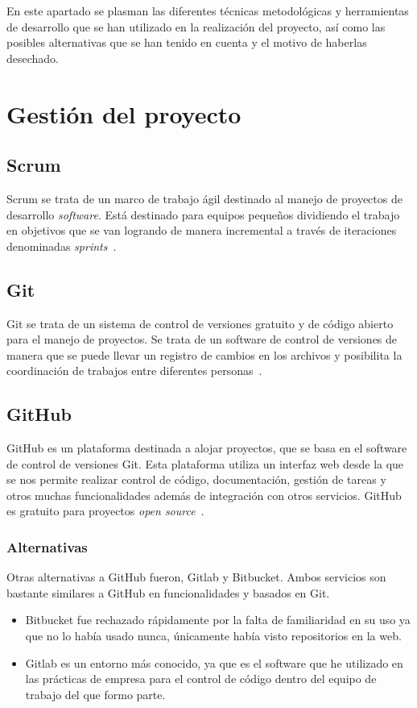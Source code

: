 
En este apartado se plasman las diferentes técnicas metodológicas y herramientas de desarrollo que se han utilizado en la realización del proyecto, así como las posibles alternativas que se han tenido en cuenta y el motivo de haberlas desechado.

\section{Gestión del proyecto}\label{GesProyecto}
\subsection{Scrum}\label{Scrum}
Scrum se trata de un marco de trabajo ágil destinado al manejo de proyectos de desarrollo \emph{software}. Está destinado para equipos pequeños dividiendo el trabajo en objetivos que se van logrando de manera incremental a través de iteraciones denominadas \emph{sprints}~\cite{wiki:scrm}.

\subsection{Git}\label{Git}
Git se trata de un sistema de control de versiones gratuito y de código abierto para el manejo de proyectos. Se trata de un software de control de versiones de manera que se puede llevar un registro de cambios en los archivos y posibilita la coordinación de trabajos entre diferentes personas~\cite{git_1,git_2}.

\subsection{GitHub}\label{GitHub}
GitHub es un plataforma destinada a alojar proyectos, que se basa en el software de control de versiones Git. Esta plataforma utiliza un interfaz web desde la que se nos permite realizar control de código, documentación, gestión de tareas y otros muchas funcionalidades además de integración con otros servicios. GitHub es gratuito para proyectos \emph{open source}~\cite{wiki:github_wiki,github}.

\subsubsection{Alternativas}\label{AlternativasGitHub}
Otras alternativas a GitHub fueron, Gitlab y Bitbucket. Ambos servicios son bastante similares a GitHub en funcionalidades y basados en Git.
\begin{itemize}
	\item Bitbucket fue rechazado rápidamente por la falta de familiaridad en su uso ya que no lo había usado nunca, únicamente había visto repositorios en la web.
	
	\item Gitlab es un entorno más conocido, ya que es el software que he utilizado en las prácticas de empresa para el control de código dentro del equipo de trabajo del que formo parte.
\end{itemize}


